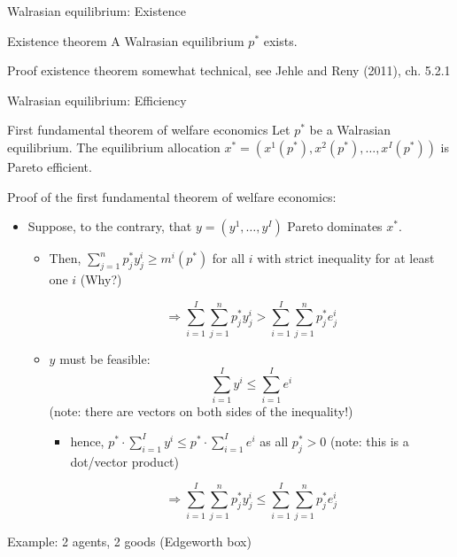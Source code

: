 \documentclass[bigger]{beamer}
\begin{document}
\begin{frame}[label={sec:org612c21b}]{Walrasian equilibrium: Existence}
\begin{block}{Existence theorem}
A Walrasian equilibrium \(p^*\) exists. 
\end{block}
\begin{block}{Proof existence theorem}
somewhat technical, see Jehle and Reny (2011), ch. 5.2.1
\end{block}
\end{frame}
\begin{frame}[label={sec:org9d92ea0}]{Walrasian equilibrium: Efficiency}
\begin{block}{First fundamental theorem of welfare economics}
Let \(p^*\) be a Walrasian equilibrium. The equilibrium allocation \(x^*=(x^1(p^*),x^2(p^*),\dots,x^I(p^* ))\) is Pareto efficient.
\end{block}
\end{frame}
\begin{frame}[label={sec:orgb5f8719}]{Proof of the first fundamental theorem of welfare economics:}
\begin{itemize}
\item Suppose, to the contrary, that \(y=(y^1,\dots,y^I)\) Pareto dominates \(x^*\).
\begin{itemize}
\item Then, \(\sum_{j=1}^n p^*_j y_j^i\geq m^i(p^*)\) for all \(i\) with strict inequality for at least one \(i\) (Why?)
\vspace*{0.3cm}

$$\Rightarrow\sum_{i=1}^I\sum_{j=1}^n p^*_j y_j^i>\sum_{i=1}^I \sum_{j=1}^n p^*_je^i_j$$
\item \(y\) must be feasible:$$\sum_{i=1}^I y^i\leq\sum_{i=1}^I e^i$$  (note: there are vectors on both sides of the inequality!)
\begin{itemize}
\item hence, \(p^* \cdot \sum_{i=1}^I y^i\leq p^*\cdot\sum_{i=1}^I e^i\) as all \(p^*_j>0\) \linebreak (note: this is a dot/vector product)
\end{itemize}
$$\Rightarrow\sum_{i=1}^I\sum_{j=1}^n p^*_j y_j^i\leq \sum_{i=1}^I \sum_{j=1}^n p^*_je^i_j$$
\end{itemize}
\end{itemize}
\end{frame}


\begin{frame}[label={sec:org6a6a6f8}]{Example: 2 agents, 2 goods (Edgeworth box)}
\end{frame}
\end{document}
